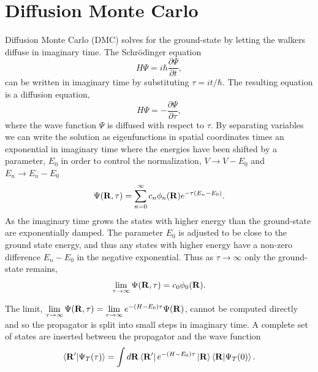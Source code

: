 \section{Diffusion Monte Carlo}
Diffusion Monte Carlo (DMC) solves for the ground-state by letting the walkers diffuse in imaginary time. The Schr\"odinger equation
\begin{equation}
   H\Psi = i\hbar\frac{\partial\Psi}{\partial t},
\end{equation}
can be written in imaginary time by substituting $\tau=it/\hbar$. The resulting equation is a diffusion equation,
\begin{equation}
   H\Psi = -\frac{\partial\Psi}{\partial\tau},
   \label{equ:diffusion}
\end{equation}
where the wave function $\Psi$ is diffused with respect to $\tau$. By separating variables we can write the solution as eigenfunctions in spatial coordinates times an exponential in imaginary time where the energies have been shifted by a parameter, $E_0$ in order to control the normalization, $V\rightarrow V - E_0$ and $E_n \rightarrow E_n-E_0$
\begin{equation}
   \Psi(\mathbf{R},\tau) = \sum\limits_{n=0}^\infty c_n\phi_n(\mathbf{R})e^{-\tau(E_n-E_0)}.
\end{equation}
As the imaginary time grows the states with higher energy than the ground-state are exponentially damped. The parameter $E_0$ is adjusted to be close to the ground state energy, and thus any states with higher energy have a non-zero difference $E_n-E_0$ in the negative exponential. Thus as $\tau\rightarrow\infty$ only the ground-state remains,
\begin{equation}
   \lim\limits_{\tau\rightarrow\infty}\Psi(\mathbf{R},\tau) = c_0\phi_0(\mathbf{R}).
\end{equation}

The limit, $\lim\limits_{\tau\rightarrow\infty}\Psi(\mathbf{R},\tau) = \lim\limits_{\tau\rightarrow\infty}e^{-(H-E_0)\tau}\Psi(\mathbf{R})$, cannot be computed directly and so the propagator is split into small steps in imaginary time. A complete set of states are inserted between the propagator and the wave function
\begin{equation}
   \left< \mathbf{R}' | \Psi_T(\tau) \right> = \int d\mathbf{R} \left< \mathbf{R}' \right|e^{-(H-E_0)\tau}\left| \mathbf{R} \right>\left< \mathbf{R} | \Psi_T(0) \right>.
\end{equation}

